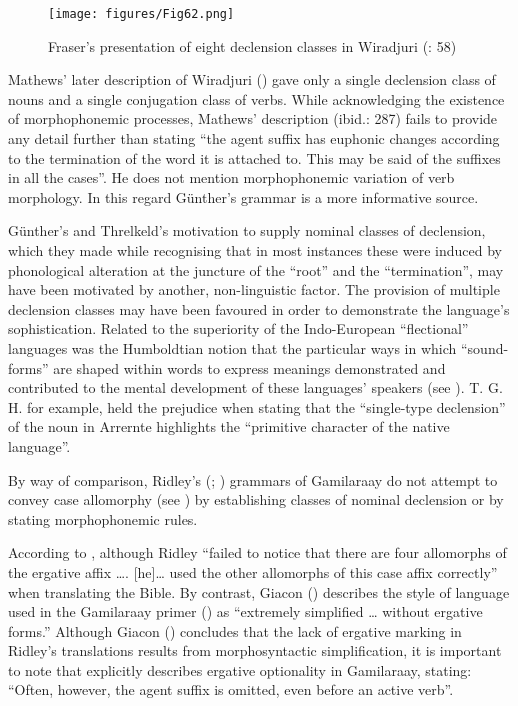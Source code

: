 \begin{figure}[t]
\texttt{[image: figures/Fig62.png]}
\caption{Fraser’s presentation of eight declension classes in Wiradjuri (\citealt{gunther_grammar_1892}: 58)}
\label{fig:4:62}
\end{figure}


Mathews' later description of Wiradjuri (\citeyear{mathews_wiradyuri_1904}) gave only a single declension class of nouns and a single conjugation class of verbs. While acknowledging the existence of morphophonemic processes, Mathews' description (ibid.: 287) fails to provide any detail further than stating “the agent suffix has euphonic changes according to the termination of the word it is attached to. This may be said of the suffixes in all the cases”. He does not mention morphophonemic variation of verb morphology. In this regard Günther’s grammar is a more informative source. 

Günther’s and Threlkeld’s motivation to supply nominal classes of declension, which they made while recognising that in most instances these were induced by phonological alteration at the juncture of the “root” and the ``termination'', may have been motivated by another, non-linguistic factor. The provision of multiple declension classes may have been favoured in order to demonstrate the language’s sophistication. Related to the superiority of the Indo-European “flectional” languages was the Humboldtian notion that the particular ways in which “sound-forms” are shaped within words to express meanings demonstrated and contributed to the mental development of these languages' speakers (see \citealt{losonsky_humboldt_1999}). T. G. H. \citet{strehlow_aranda_1944} for example, held the prejudice when stating that the “single-type declension” of the noun in Arrernte highlights the “primitive character of the native language”.





\largerpage
By way of comparison, Ridley’s (\citeyear{ridley_kamilaroi_1855-1}; \citeyear{ridley_gurre_1856}) grammars of Gamilaraay do not attempt to convey case allomorphy (see \citealt[62]{austin_reference_1993}) by establishing classes of nominal declension or by stating morphophonemic rules. 

According to \citet[63]{austin_reference_1993}, although Ridley “failed to notice that there are four allomorphs of the ergative affix …. [he]… used the other allomorphs of this case affix correctly” when translating the Bible. By contrast, Giacon (\citeyear[5]{giacon_2014}) describes the style of language used in the Gamilaraay primer (\citeyear{ridley_kamilaroi_1856}) as “extremely simplified … without ergative forms.” Although Giacon (\citeyear[23--24]{giacon_2014}) concludes that the lack of ergative marking in Ridley’s translations results from morphosyntactic simplification, it is important to note that \citet{ridley_kamilaroi_1875} explicitly describes ergative optionality in Gamilaraay, stating: “Often, however, the agent suffix is omitted, even before an active verb”. 

